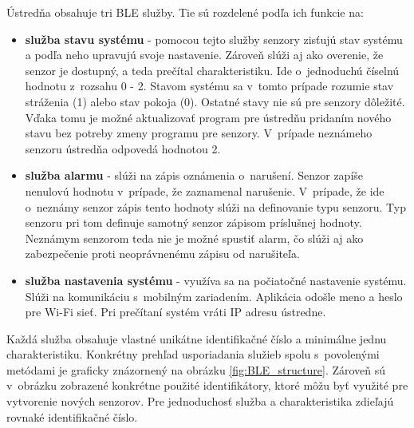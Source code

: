 Ústredňa obsahuje tri BLE služby. Tie sú rozdelené podľa ich funkcie na:
\begin{itemize}
    \item \textbf{služba stavu systému} - pomocou tejto služby senzory zisťujú stav systému a podľa neho upravujú svoje nastavenie. Zároveň slúži aj ako overenie, že senzor je dostupný, a teda prečítal charakteristiku. Ide o~jednoduchú číselnú hodnotu z~rozsahu 0 - 2. Stavom systému sa v~tomto prípade rozumie stav stráženia (1) alebo stav pokoja (0). Ostatné stavy nie sú pre senzory dôležité. Vďaka tomu je možné aktualizovať program pre ústredňu pridaním nového stavu bez potreby zmeny programu pre senzory. V~prípade neznámeho senzoru ústredňa odpovedá hodnotou 2.
    \item \textbf{služba alarmu} - slúži na zápis oznámenia o~narušení. Senzor zapíše nenulovú hodnotu v~prípade, že zaznamenal narušenie. V~prípade, že ide o~neznámy senzor zápis tento hodnoty slúži na definovanie typu senzoru. Typ senzoru pri tom definuje samotný senzor zápisom príslušnej hodnoty. Neznámym senzorom teda nie je možné spustiť alarm, čo slúži aj ako zabezpečenie proti neoprávnenému zápisu od narušiteľa.
    \item \textbf{služba nastavenia systému} - využíva sa na počiatočné nastavenie systému. Slúži na komunikáciu s~mobilným zariadením. Aplikácia odošle meno a heslo pre Wi-Fi sieť. Pri prečítaní systém vráti IP adresu ústredne.
\end{itemize}

Každá služba obsahuje vlastné unikátne identifikačné číslo a minimálne jednu charakteristiku. Konkrétny prehľad usporiadania služieb spolu s~povolenými metódami je graficky znázornený na obrázku \ref{fig:BLE_structure}. Zároveň sú v~obrázku zobrazené konkrétne použité identifikátory, ktoré môžu byť využité pre vytvorenie nových senzorov. Pre jednoduchosť služba a charakteristika zdieľajú rovnaké identifikačné číslo. 

